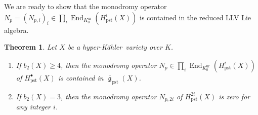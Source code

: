 \documentclass[12pt,reqno]{amsart}
\newtheorem{thm}{Theorem}[section]
\theoremstyle{definition}
\newcommand\End{\mathop{\mathrm{End}}\nolimits}
\renewcommand\ge{\mathop{\mathfrak{g}}\nolimits}
\newcommand{\hk}{hyper-Kähler~}
\DeclareMathOperator{\pst}{pst}
\DeclareMathOperator{\ur}{ur}
\numberwithin{equation}{section}
\begin{document}
We are ready to show that
the monodromy operator
$N_p=(N_{p,i})_i \in \prod_i \End_{K^{\ur}_0}(H^i_{\pst}(X))$
is contained in the reduced LLV Lie algebra.


\begin{thm}	
\label{thm:universalmonodromyp-adic}
Let $X$ be a \hk variety over $K$.
\begin{enumerate}
    \item If $b_2(X) \geq 4$, then the monodromy operator
    $N_p \in \prod_i \End_{K^{\ur}_0}(H^i_{\pst}(X))$
of $H^\bullet_{\pst}(X)$ is contained in $\overline{\ge}_{\pst}(X)$.
    \item If $b_2(X) = 3$, then the monodromy operator
    $N_{p, 2i}$ of $H^{2i}_{\pst}(X)$ is zero for any integer $i$.
\end{enumerate}
\end{thm}
\end{document}
